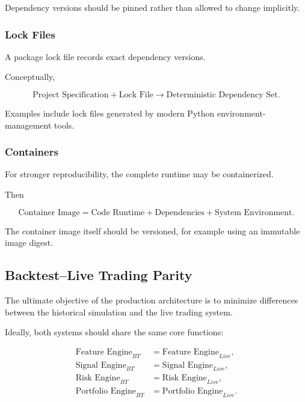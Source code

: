 \documentclass[11pt,a4paper]{article}
\begin{document}
Dependency versions should be pinned rather than allowed to change implicitly.


\subsubsection{Lock Files}

A package lock file records exact dependency versions.

Conceptually,

\begin{equation}
\boxed{
\text{Project Specification}
+
\text{Lock File}
\rightarrow
\text{Deterministic Dependency Set}.
}
\end{equation}

Examples include lock files generated by modern Python environment-management
tools.


\subsubsection{Containers}

For stronger reproducibility, the complete runtime may be containerized.

Then

\begin{equation}
\boxed{
\text{Container Image}
=
\text{Code Runtime}
+
\text{Dependencies}
+
\text{System Environment}.
}
\end{equation}

The container image itself should be versioned, for example using an immutable
image digest.


\subsection{Backtest--Live Trading Parity}
\label{subsec:backtest_live_parity}

The ultimate objective of the production architecture is to minimize differences
between the historical simulation and the live trading system.

Ideally, both systems should share the same core functions:

\begin{equation}
\boxed{
\begin{aligned}
\text{Feature Engine}_{BT}
&=
\text{Feature Engine}_{Live},
\\
\text{Signal Engine}_{BT}
&=
\text{Signal Engine}_{Live},
\\
\text{Risk Engine}_{BT}
&=
\text{Risk Engine}_{Live},
\\
\text{Portfolio Engine}_{BT}
&=
\text{Portfolio Engine}_{Live}.
\end{aligned}
}
\end{equation}
\end{document}
